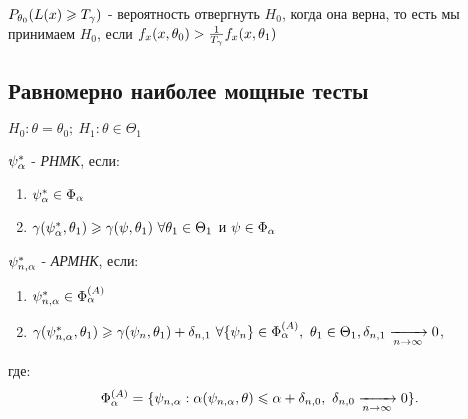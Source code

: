 $P_{\theta_0}(L(x) \geqslant T_{\gamma})$ - вероятность отвергнуть $H_0$, когда она верна, то есть мы принимаем $H_0$, если $f_x(x, \theta_0) > \frac{1}{T_{\gamma}}f_x(x, \theta_1)$

\subsection{Равномерно наиболее мощные тесты}

$H_0 : \theta = \theta_0;~H_1 : \theta \in \Theta_1$
\begin{definition}
  $\psi_{\alpha}^{*}$ - \textit{РНМК}, если:
  \begin{enumerate}
    \item $\psi_{\alpha}^{*} \in \Phi_{\alpha}$
    \item $\gamma(\psi_{\alpha}^{*}, \theta_1) \geqslant \gamma(\psi, \theta_1)~\forall \theta_1 \in \Theta_1$ и $\psi \in \Phi_{\alpha}$
  \end{enumerate}
\end{definition}

\begin{definition}
  $\psi_{n, \alpha}^{*}$ - \textit{АРМНК}, если:
  \begin{enumerate}
    \item $\psi_{n, \alpha}^{*} \in \Phi_{\alpha}^{(A)}$
    \item $\gamma(\psi_{n, \alpha}^{*}, \theta_1) \geqslant \gamma(\psi_n, \theta_1) + \delta_{n, 1}~\forall\{\psi_n\} \in \Phi_{\alpha}^{(A)},~\theta_1 \in \Theta_1,\delta_{n, 1} \xrightarrow[n \to \infty]{} 0$,
  \end{enumerate}
  где: 
  \[
    \Phi_{\alpha}^{(A)} = \{ \psi_{n, \alpha} : \alpha(\psi_{n, \alpha}, \theta) \leqslant \alpha + \delta_{n, 0},~\delta_{n, 0} \xrightarrow[n \to \infty]{} 0 \}
  .\]
\end{definition}
